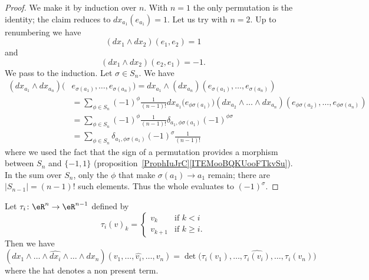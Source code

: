 \begin{proof}
	We make it by induction over \( n\). With \( n=1\) the only permutation is the identity; the claim reduces to \( dx_{a_1}(e_{a_1})=1\). Let us try with \( n=2\). Up to renumbering we have
	\begin{equation}
		(dx_1\wedge dx_2)(e_1,e_2)=1
	\end{equation}
	and
	\begin{equation}
		(dx_1\wedge dx_2)(e_2,e_1)=-1.
	\end{equation}
	We pass to the induction. Let \( \sigma\in S_n\). We have
	\begin{subequations}
		\begin{align}
			(dx_{a_1}\wedge dx_{a_n})( & e_{\sigma(a_1)},\ldots, e_{\sigma(a_n)})=dx_{a_1}\wedge (dx_{a_n})(e_{\sigma(a_1)},\ldots, e_{\sigma(a_n)})                                                                   \\
			                           & =\sum_{\phi\in S_n}(-1)^{\phi}\frac{1}{ (n-1)! }dx_{a_1}\big( e_{\phi\sigma(a_1)} \big)(dx_{a_2}\wedge\ldots\wedge dx_{a_n})(e_{\phi\sigma(a_2)},\ldots, e_{\phi\sigma(a_n)}) \\
			                           & =\sum_{\phi\in S_n}(-1)^{\phi}\frac{1}{ (n-1)! }\delta_{a_1,\phi\sigma(a_1)}(-1)^{\phi\sigma}                                                                                 \\
			                           & =\sum_{\phi\in S_n}\delta_{a_1,\phi\sigma(a_1)}(-1)^{\sigma}\frac{1}{ (n-1)! }
		\end{align}
	\end{subequations}
	where we used the fact that the sign of a permutation provides a morphism between \( S_n\) and \( \{ -1,1 \}\) (proposition~\ref{ProphIuJrC}\ref{ITEMooBQKUooFTkvSu}). In the sum over \( S_n\), only the \( \phi\) that make \( \sigma(a_1)\to a_1\) remain; there are \( | S_{n-1} |=(n-1)!\) such elements. Thus the whole evaluates to \( (-1)^{\sigma}\).
\end{proof}

\begin{lemma}    \label{LEMooICRXooFKPCRd}
	Let \( \tau_i\colon \eR^n\to \eR^{n-1}\) defined by
	\begin{equation}
		\tau_i(v)_k=\begin{cases}
			v_k     & \text{if } k<i             \\
			v_{k+1} & \text{if } k\geq i\text{.}
		\end{cases}
	\end{equation}
	Then we have
	\begin{equation}
		(dx_1\wedge\ldots\wedge\widehat{dx_i}\wedge\ldots\wedge dx_n)(v_1,\ldots, \widehat{v_i},\ldots, v_n)=
		\det\Big(  \tau_i(v_1),\ldots, \widehat{\tau_i(v_i)},\ldots, \tau_i(v_n)  \Big)
	\end{equation}
	where the hat denotes a non present term.
\end{lemma}

